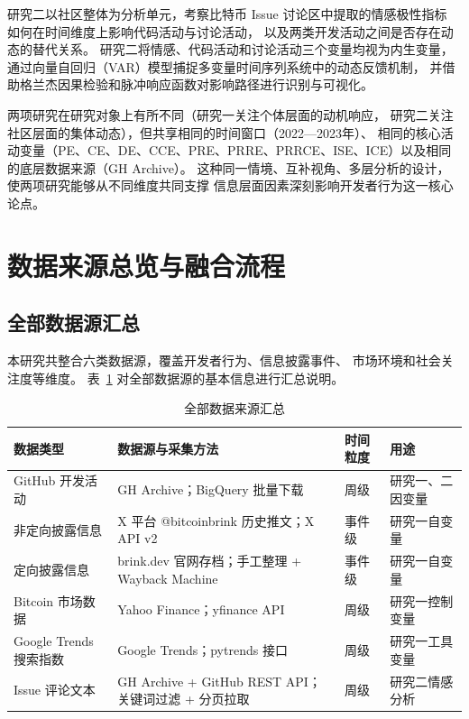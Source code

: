 \documentclass[
    type = master, %
    degree = professional,        %
    decl-page,  %
    twoside,                %
    fontset = fandol %
  ]{njuthesis}
\begin{document}
研究二以社区整体为分析单元，考察比特币 Issue 讨论区中提取的情感极性指标
如何在时间维度上影响代码活动与讨论活动，
以及两类开发活动之间是否存在动态的替代关系。
研究二将情感、代码活动和讨论活动三个变量均视为内生变量，
通过向量自回归（VAR）模型捕捉多变量时间序列系统中的动态反馈机制，
并借助格兰杰因果检验和脉冲响应函数对影响路径进行识别与可视化。

两项研究在研究对象上有所不同（研究一关注个体层面的动机响应，
研究二关注社区层面的集体动态），但共享相同的时间窗口（2022—2023年）、
相同的核心活动变量（PE、CE、DE、CCE、PRE、PRRE、PRRCE、ISE、ICE）以及相同的底层数据来源（GH Archive）。
这种同一情境、互补视角、多层分析的设计，使两项研究能够从不同维度共同支撑
信息层面因素深刻影响开发者行为这一核心论点\cite{hu2025license}。

\section{数据来源总览与融合流程}

\subsection{全部数据源汇总}

本研究共整合六类数据源，覆盖开发者行为、信息披露事件、
市场环境和社会关注度等维度。
表~\ref{tab:data-overview} 对全部数据源的基本信息进行汇总说明。

\begin{table}[htbp]
    \centering
    \small
    \caption{全部数据来源汇总}
    \label{tab:data-overview}
    \begin{tabularx}{\textwidth}{p{3.2cm}Xp{2.8cm}p{2.8cm}}
        \toprule
        数据类型 & 数据源与采集方法 & 时间粒度 & 用途 \\
        \midrule
        GitHub 开发活动
            & GH Archive；BigQuery 批量下载
            & 周级
            & 研究一、二因变量 \\
        非定向披露信息
            & X 平台 @bitcoinbrink 历史推文；X API v2
            & 事件级
            & 研究一自变量 \\
        定向披露信息
            & brink.dev 官网存档；手工整理 + Wayback Machine
            & 事件级
            & 研究一自变量 \\
        Bitcoin 市场数据
            & Yahoo Finance；yfinance API
            & 周级
            & 研究一控制变量 \\
        Google Trends 搜索指数
            & Google Trends；pytrends 接口
            & 周级
            & 研究一工具变量 \\
        Issue 评论文本
            & GH Archive + GitHub REST API；关键词过滤 + 分页拉取
            & 周级
            & 研究二情感分析 \\
        \bottomrule
    \end{tabularx}
\end{table}
\end{document}

